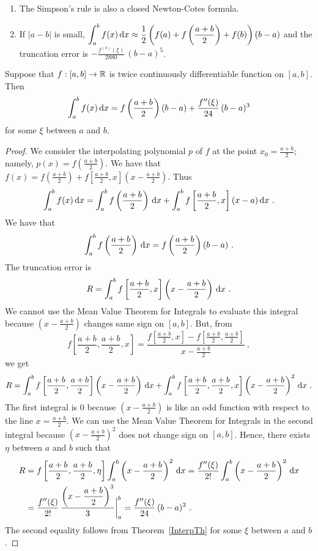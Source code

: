 \begin{rmkList}
\begin{enumerate}
\item The Simpson's rule is also a closed Newton-Cotes formula.
\item If $|a-b|$ is small,
$\displaystyle \int_a^b  f(x)\,\mathrm{d}x \approx
\frac{1}{2}\left(f(a) +f\left(\frac{a+b}{2}\right) +f(b)\right)(b-a)$
and the truncation error is
$\displaystyle -\frac{f^{(4)}(\xi)}{2880}\,(b-a)^5$.
\end{enumerate}
\end{rmkList}

\begin{theorem}
Suppose that $f:[a,b]\rightarrow \mathbb{R}$ is twice continuously
differentiable function on $[a,b]$.  Then
\[
\int_a^b  f(x)\,\mathrm{d}x = f\left(\frac{a+b}{2}\right)(b-a)
+ \frac{f''(\xi)}{24}\,(b-a)^3
\]
for some $\xi$ between $a$ and $b$.
\end{theorem}

\begin{proof}
We consider the interpolating polynomial $p$ of $f$ at
the point
$\displaystyle x_0=\frac{a+b}{2}$; namely,
$\displaystyle p(x) = f\left(\frac{a+b}{2}\right)$.  We have that
$\displaystyle f(x) = f\left(\frac{a+b}{2}\right)
+ f\left[\frac{a+b}{2},x\right]\left(x-\frac{a+b}{2}\right)$.
Thus
\[
\int_a^b  f(x) \,\mathrm{d}x =
\int_a^b f\left(\frac{a+b}{2}\right) \,\mathrm{d}x +
\int_a^b f\left[\frac{a+b}{2},x\right](x-a)\,\mathrm{d}x \ .
\]
We have that
\[
\int_a^b f\left(\frac{a+b}{2}\right) \,\mathrm{d}x
= f\left(\frac{a+b}{2}\right) (b-a) \ .
\]
The truncation error is
\[
R = \int_a^b f\left[\frac{a+b}{2},x\right]
\left(x-\frac{a+b}{2}\right)\,\mathrm{d}x \ .
\]
We cannot use the Mean Value Theorem for Integrals to
evaluate this integral because
$\displaystyle \left(x-\frac{a+b}{2}\right)$ changes same sign on
$[a,b]$.  But, from
\[
f\left[\frac{a+b}{2},\frac{a+b}{2},x\right] =
\frac{\displaystyle f\left[\frac{a+b}{2},x\right] -
f\left[\frac{a+b}{2},\frac{a+b}{2}\right]}
{\displaystyle x - \frac{a+b}{2}} \ ,
\]
we get
\[
R = \int_a^b f\left[\frac{a+b}{2},\frac{a+b}{2}\right]
\left(x-\frac{a+b}{2}\right)\,\mathrm{d}x
+ \int_a^b f\left[\frac{a+b}{2},\frac{a+b}{2},x\right]
\left(x-\frac{a+b}{2}\right)^2\,\mathrm{d}x \ .
\]
The first integral is $0$ because
$\displaystyle \left(x-\frac{a+b}{2}\right)$ is like an odd function
with respect to the line $\displaystyle x=\frac{a+b}{2}$.  We can use
the Mean Value Theorem for Integrals in the second integral
because $\displaystyle \left(x-\frac{a+b}{2}\right)^2$ does not change
sign on $[a,b]$.  Hence, there exists $\eta$ between $a$ and $b$
such that
\begin{align*}
R &= f\left[\frac{a+b}{2},\frac{a+b}{2},\eta\right]
\int_a^b \left(x-\frac{a+b}{2}\right)^2\,\mathrm{d}x
= \frac{f''(\xi)}{2!}\int_a^b \left(x-\frac{a+b}{2}\right)^2\,\mathrm{d}x \\
&= \frac{f''(\xi)}{2!}\,
\frac{\displaystyle \left(x -\frac{a+b}{2}\right)^3}{3}\bigg|_a^b
= \frac{f''(\xi)}{24}\,(b-a)^3 \ .
\end{align*}
The second equality follows from Theorem~\ref{InterpTh} for some
$\xi$ between $a$ and $b$.
\end{proof}

